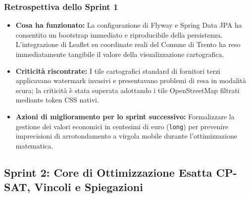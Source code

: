 \subsubsection{Retrospettiva dello Sprint 1}
\begin{itemize}[leftmargin=1.4em, itemsep=0.2em]
    \item \textbf{Cosa ha funzionato:} La configurazione di Flyway e Spring Data JPA ha consentito un bootstrap immediato e riproducibile della persistenza. L'integrazione di Leaflet su coordinate reali del Comune di Trento ha reso immediatamente tangibile il valore della visualizzazione cartografica.
    \item \textbf{Criticità riscontrate:} I tile cartografici standard di fornitori terzi applicavano watermark invasivi e presentavano problemi di resa in modalità scura; la criticità è stata superata adottando i tile OpenStreetMap filtrati mediante token CSS nativi.
    \item \textbf{Azioni di miglioramento per lo sprint successivo:} Formalizzare la gestione dei valori economici in centesimi di euro (\texttt{long}) per prevenire imprecisioni di arrotondamento a virgola mobile durante l'ottimizzazione matematica.
\end{itemize}

\subsection{Sprint 2: Core di Ottimizzazione Esatta CP-SAT, Vincoli e Spiegazioni}


